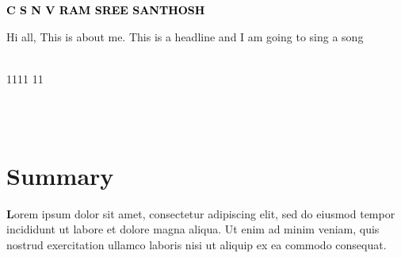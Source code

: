 \documentclass[letterpaper,9pt]{article}
\newcommand{\phvfont}[1]{{\fontfamily{phv}\selectfont #1}}
\begin{document}
    
    \begin{minipage}[t]{0.5\textwidth} 
      \vspace{-\baselineskip} 
      
      { \fontsize{16}{20} \textcolor{black}{\textbf{\phvfont{C S N V RAM SREE SANTHOSH}}}} 
      
      \vspace{10pt}
      \begin{minipage}[t]{0.9\textwidth}
        \phvfont{\small Hi all, This is about me. This is a headline and I am going to sing a song}
      \end{minipage}

    \end{minipage}
    \hfill
    \begin{minipage}[t]{0.3\textwidth} 
      \vspace{-\baselineskip} 
      
      \\ 
       1111 11\\
      \
    \end{minipage}
    \begin{minipage}[t]{0.24\textwidth} %
      \vspace{-\baselineskip} %
      
      \	
      \
      \    
    \end{minipage}
    \vspace*{7mm}
     
    \begin{minipage}[t]{0.46\textwidth}
    \section{\textbf{Summary}}
	\textbf Lorem ipsum dolor sit amet, consectetur adipiscing elit, sed do eiusmod tempor incididunt ut labore et dolore magna aliqua. 
    Ut enim ad minim veniam, quis nostrud exercitation ullamco laboris nisi ut aliquip ex ea commodo consequat.  \\
\end{minipage}
    \hfill
    
\end{document}
